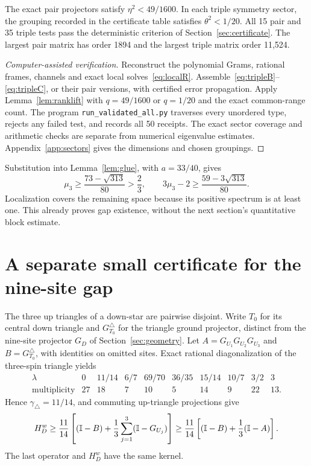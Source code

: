 \documentclass[11pt,a4paper]{article}
\theoremstyle{remark}\newtheorem{remark}[theorem]{Remark}
\begin{document}
\begin{proposition}\label{prop:angles}
The exact pair projectors satisfy $\eta^2<49/1600$. In each triple symmetry sector, the grouping recorded in the certificate table satisfies $\theta^2<1/20$. All 15 pair and 35 triple tests pass the deterministic criterion of Section~\ref{sec:certificate}. The largest pair matrix has order 1894 and the largest triple matrix order 11,524.
\end{proposition}
\begin{proof}[Computer-assisted verification]
Reconstruct the polynomial Grams, rational frames, channels and exact local solves~\eqref{eq:localR}. Assemble~\eqref{eq:tripleB}--\eqref{eq:tripleC}, or their pair versions, with certified error propagation. Apply Lemma~\ref{lem:ranklift} with $q=49/1600$ or $q=1/20$ and the exact common-range count. The program \texttt{run\_validated\_all.py} traverses every unordered type, rejects any failed test, and records all 50 receipts. The exact sector coverage and arithmetic checks are separate from numerical eigenvalue estimates. Appendix~\ref{app:sectors} gives the dimensions and chosen groupings.
\end{proof}
Substitution into Lemma~\ref{lem:glue}, with $a=33/40$, gives
\begin{equation}\label{eq:mu}
 \mu_3\ge\frac{73-\sqrt{313}}{80}>\frac23,
 \qquad 3\mu_3-2\ge\frac{59-3\sqrt{313}}{80}.
\end{equation}
Localization covers the remaining space because its positive spectrum is at least one. This already proves gap existence, without the next section's quantitative block estimate.

\section{A separate small certificate for the nine-site gap}\label{sec:block}
The three up triangles of a down-star are pairwise disjoint. Write $T_0$ for its central down triangle and $G_{T_0}^{\triangle}$ for the triangle ground projector, distinct from the nine-site projector $G_D$ of Section~\ref{sec:geometry}. Let $A=G_{U_1}G_{U_2}G_{U_3}$ and $B=G_{T_0}^{\triangle}$, with identities on omitted sites. Exact rational diagonalization of the three-spin triangle yields
\[
\begin{array}{c|rrrrrrrrr}
\lambda&0&11/14&6/7&69/70&36/35&15/14&10/7&3/2&3\\\hline
\text{multiplicity}&27&18&7&10&5&14&9&22&13.
\end{array}
\]
Hence $\gamma_\triangle=11/14$, and commuting up-triangle projections give
\begin{equation}\label{eq:blockdom}
 H_D^w\ge\frac{11}{14}\left[(\mathbb I-B)+\frac13\sum_{j=1}^3(\mathbb I-G_{U_j})\right]
 \ge\frac{11}{14}\left[(\mathbb I-B)+\frac13(\mathbb I-A)\right].
\end{equation}
The last operator and $H_D^w$ have the same kernel.
\end{document}
